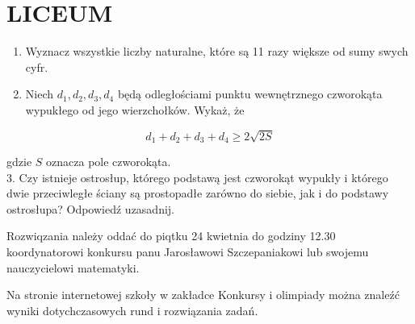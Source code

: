 \documentclass[10pt]{article}
\begin{document}
\section*{LICEUM}
\begin{enumerate}
  \item Wyznacz wszystkie liczby naturalne, które są 11 razy większe od sumy swych cyfr.
  \item Niech \(d_{1}, d_{2}, d_{3}, d_{4}\) będą odległościami punktu wewnętrznego czworokąta wypukłego od jego wierzchołków. Wykaż, że
\end{enumerate}

\[
d_{1}+d_{2}+d_{3}+d_{4} \geq 2 \sqrt{2 S}
\]

gdzie \(S\) oznacza pole czworokąta.\\
3. Czy istnieje ostrosłup, którego podstawą jest czworokąt wypukły i którego dwie przeciwległe ściany są prostopadłe zarówno do siebie, jak i do podstawy ostrosłupa? Odpowiedź uzasadnij.

Rozwiqzania należy oddać do piqtku 24 kwietnia do godziny 12.30 koordynatorowi konkursu panu Jarosławowi Szczepaniakowi lub swojemu nauczycielowi matematyki.

Na stronie internetowej szkoły w zakładce Konkursy i olimpiady można znaleźć wyniki dotychczasowych rund i rozwiązania zadań.
\end{document}
